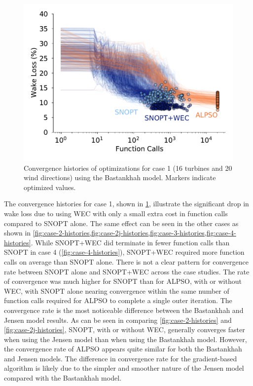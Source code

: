 \documentclass[hidelinks,sort&compress,AMA,STIX1COL]{WileyNJD-v2}
\providecommand{\DIFaddbeginFL}{} %
\providecommand{\DIFaddendFL}{} %
\providecommand{\DIFdelbeginFL}{} %
\providecommand{\DIFdelendFL}{} %
\newcommand{\DIFscaledelfig}{0.5}
\newlength{\DIFdelgraphicswidth} %
\newlength{\DIFdelgraphicsheight} %
\newcommand{\DIFaddincludegraphics}[2][]{{\color{blue}\fbox{\DIFOincludegraphics[#1]{#2}}}} %
\newcommand{\DIFdelincludegraphics}[2][]{%
\sbox{\DIFdelgraphicsbox}{\DIFOincludegraphics[#1]{#2}}%
\settoboxwidth{\DIFdelgraphicswidth}{\DIFdelgraphicsbox} %
\settoboxtotalheight{\DIFdelgraphicsheight}{\DIFdelgraphicsbox} %
\scalebox{\DIFscaledelfig}{%
\parbox[b]{\DIFdelgraphicswidth}{\usebox{\DIFdelgraphicsbox}\\[-\baselineskip] \rule{\DIFdelgraphicswidth}{0em}}\llap{\resizebox{\DIFdelgraphicswidth}{\DIFdelgraphicsheight}{%
\setlength{\unitlength}{\DIFdelgraphicswidth}%
\begin{picture}(1,1)%
\thicklines\linethickness{2pt} %
{\color[rgb]{1,0,0}\put(0,0){\framebox(1,1){}}}%
{\color[rgb]{1,0,0}\put(0,0){\line( 1,1){1}}}%
{\color[rgb]{1,0,0}\put(0,1){\line(1,-1){1}}}%
\end{picture}%
}\hspace*{3pt}}} %
} %
\DeclareRobustCommand{\DIFaddbeginFL}{\DIFOaddbeginFL \let\includegraphics\DIFaddincludegraphics} %
\DeclareRobustCommand{\DIFaddendFL}{\DIFOaddendFL \let\includegraphics\DIFOincludegraphics} %
\DeclareRobustCommand{\DIFdelbeginFL}{\DIFOdelbeginFL \let\includegraphics\DIFdelincludegraphics} %
\DeclareRobustCommand{\DIFdelendFL}{\DIFOaddendFL \let\includegraphics\DIFOincludegraphics} %
\begin{document}
\begin{figure}[h!]
	\centering
	\begin{minipage}[t]{.45\textwidth}
		\centering
		\DIFdelbeginFL %
\DIFdelendFL \DIFaddbeginFL \includegraphics[width=\textwidth]{final_images/results/Figure_20}  
		\DIFaddendFL \caption{Convergence histories of optimizations for case 1 (16 turbines and 20 wind directions) using the Bastankhah model. Markers indicate optimized values.}
		\label{fig:case-1-histories}
	\end{minipage}
\end{figure}

The convergence histories for case 1, shown in \cref{fig:case-1-histories}, illustrate the significant drop in wake loss due to using WEC with only a small extra cost in function calls compared to SNOPT alone. The same effect can be seen in the other cases as shown in \cref{fig:case-2-histories,fig:case-2j-histories,fig:case-3-histories,fig:case-4-histories}. While SNOPT+WEC did terminate in fewer function calls than SNOPT in case 4 (\cref{fig:case-4-histories}), SNOPT+WEC required more function calls on average than SNOPT alone. There is not a clear pattern for convergence rate between SNOPT alone and SNOPT+WEC across the case studies. The rate of convergence was much higher for SNOPT than for ALPSO, with or without WEC, with SNOPT alone nearing convergence within the same number of function calls required for ALPSO to complete a single outer iteration. The convergence rate is the most noticeable difference between the Bastankhah and Jensen model results. As can be seen in comparing \cref{fig:case-2-histories} and \cref{fig:case-2j-histories}, SNOPT, with or without WEC, generally converges faster when using the Jensen model than when using the Bastankhah model. However, the convergence rate of ALPSO appears quite similar for both the Bastankhah and Jensen models. The difference in convergence rate for the gradient-based algorithm is likely due to the simpler and smoother nature of the Jensen model compared with the Bastankhah model.
\end{document}
